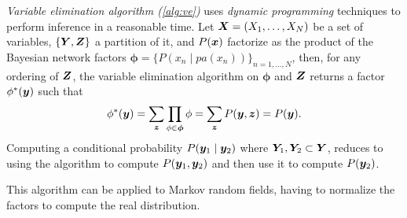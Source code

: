 \emph{Variable elimination algorithm (\ref{alg:ve})} uses \emph{dynamic programming} techniques to perform inference in a reasonable time. Let \(\bm{X} = (X_{1},\dots,X_{N})\) be a set of variables, \(\{\bm{Y}, \bm{Z}\}\) a partition of it, and \(P(\bm{x})\) factorize as the product of the Bayesian network factors \(\bm{\phi} = \{P(x_{n}\mid pa(x_{n}))\}_{n = 1,\dots, N}\),  then, for any ordering of \(\bm{Z}\), the variable elimination algorithm on \(\bm{\phi}\) and \(\bm{Z}\) returns a factor \(\phi^{*}(\bm{y})\) such that
\[
  \phi^{*}(\bm{y}) = \sum_{\bm{z}} \prod_{\phi \in \bm{\phi}}\phi = \sum_{\bm{z}} P(\bm{y}, \bm{z}) = P(\bm{y}).
\]
Computing a conditional probability  \( P(\bm{y}_{1} \mid \bm{y}_{2})\) where \(\bm{Y}_{1}, \bm{Y}_{2} \subset \bm{Y}\), reduces to using the algorithm to compute \(P(\bm{y}_{1}, \bm{y}_{2})\) and then use it to compute \(P(\bm{y}_{2})\).

\begin{remark}
  This algorithm can be applied to Markov random fields, having to normalize the factors to compute the real distribution.
\end{remark}


